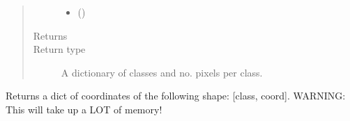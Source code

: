 \documentclass[letterpaper,10pt,english]{sphinxmanual}
\begin{document}
\begin{fulllineitems}
\begin{quote}
\begin{description}
\begin{itemize}
\item {} 
 (\sphinxstyleliteralemphasis{\sphinxupquote{, }}) \textendash{} 

\end{itemize}

\item[{Returns}] \leavevmode


\item[{Return type}] \leavevmode
A dictionary of classes and no. pixels per class.

\end{description}\end{quote}

\end{fulllineitems}


\begin{fulllineitems}
\label{\detokenize{index:pyeo.validation.build_class_dict}}
Returns a dict of coordinates of the following shape:
{[}class, coord{]}.
WARNING: This will take up a LOT of memory!

\end{fulllineitems}

\end{document}
